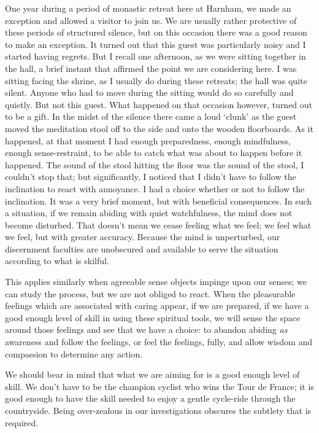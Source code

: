 One year during a period of monastic retreat here at Harnham, we made an
exception and allowed a visitor to join us. We are usually rather
protective of these periods of structured silence, but on this occasion
there was a good reason to make an exception. It turned out that this
guest was particularly noisy and I started having regrets. But I recall
one afternoon, as we were sitting together in the hall, a brief instant
that affirmed the point we are considering here. I was sitting facing
the shrine, as I usually do during these retreats; the hall was quite
silent. Anyone who had to move during the sitting would do so carefully
and quietly. But not this guest. What happened on that occasion however,
turned out to be a gift. In the midst of the silence there came a loud
‘clunk’ as the guest moved the meditation stool off to the side and onto
the wooden floorboards. As it happened, at that moment I had enough
preparedness, enough mindfulness, enough sense-restraint, to be able to
catch what was about to happen before it happened. The sound of the
stool hitting the floor was the sound of the stool, I couldn’t stop
that; but significantly, I noticed that I didn’t have to follow the
inclination to react with annoyance. I had a choice whether or not to
follow the inclination. It was a very brief moment, but with beneficial
consequences. In such a situation, if we remain abiding with quiet
watchfulness, the mind does not become disturbed. That doesn’t mean we
cease feeling what we feel; we feel what we feel, but with greater
accuracy. Because the mind is unperturbed, our discernment faculties are
unobscured and available to serve the situation according to what is
skilful.

This applies similarly when agreeable sense objects impinge upon our
senses; we can study the process, but we are not obliged to react. When
the pleasurable feelings which are associated with caring appear, if we
are prepared, if we have a good enough level of skill in using these
spiritual tools, we will sense the space around those feelings and see
that we have a choice: to abandon abiding \emph{as} awareness and follow the
feelings, or feel the feelings, fully, and allow wisdom and compassion
to determine any action.

We should bear in mind that what we are aiming for is a good enough
level of skill. We don’t have to be the champion cyclist who wins the
Tour de France; it is good enough to have the skill needed to enjoy a
gentle cycle-ride through the countryside. Being over-zealous in our
investigations obscures the subtlety that is required.

